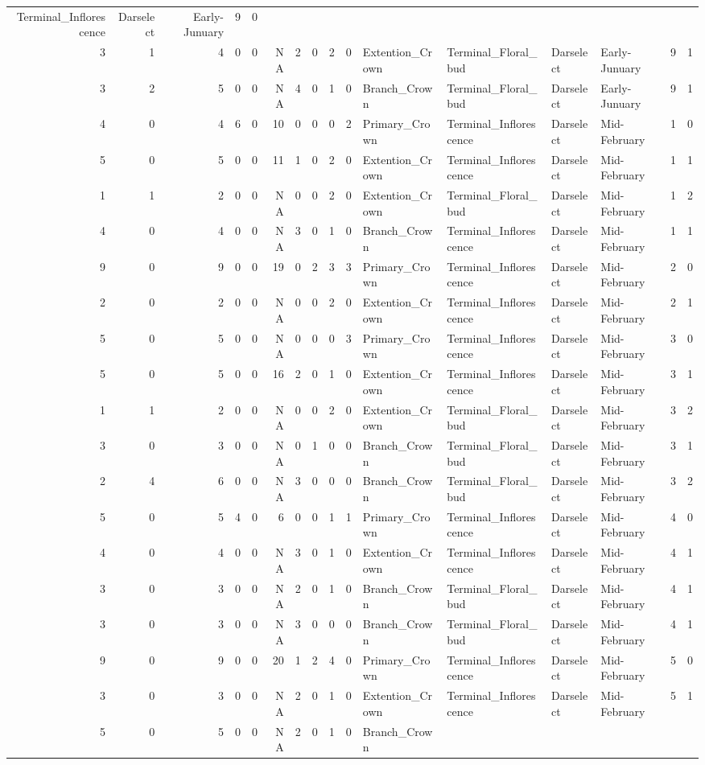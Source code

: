 \documentclass[]{article}
\begin{document}
\begin{longtable}[]{@{}rrrrrrrrrrllllrl@{}}
Terminal\_Inflorescence & Darselect & Early-Junuary & 9 &
0\tabularnewline
3 & 1 & 4 & 0 & 0 & NA & 2 & 0 & 2 & 0 & Extention\_Crown &
Terminal\_Floral\_bud & Darselect & Early-Junuary & 9 & 1\tabularnewline
3 & 2 & 5 & 0 & 0 & NA & 4 & 0 & 1 & 0 & Branch\_Crown &
Terminal\_Floral\_bud & Darselect & Early-Junuary & 9 & 1\tabularnewline
4 & 0 & 4 & 6 & 0 & 10 & 0 & 0 & 0 & 2 & Primary\_Crown &
Terminal\_Inflorescence & Darselect & Mid-February & 1 &
0\tabularnewline
5 & 0 & 5 & 0 & 0 & 11 & 1 & 0 & 2 & 0 & Extention\_Crown &
Terminal\_Inflorescence & Darselect & Mid-February & 1 &
1\tabularnewline
1 & 1 & 2 & 0 & 0 & NA & 0 & 0 & 2 & 0 & Extention\_Crown &
Terminal\_Floral\_bud & Darselect & Mid-February & 1 & 2\tabularnewline
4 & 0 & 4 & 0 & 0 & NA & 3 & 0 & 1 & 0 & Branch\_Crown &
Terminal\_Inflorescence & Darselect & Mid-February & 1 &
1\tabularnewline
9 & 0 & 9 & 0 & 0 & 19 & 0 & 2 & 3 & 3 & Primary\_Crown &
Terminal\_Inflorescence & Darselect & Mid-February & 2 &
0\tabularnewline
2 & 0 & 2 & 0 & 0 & NA & 0 & 0 & 2 & 0 & Extention\_Crown &
Terminal\_Inflorescence & Darselect & Mid-February & 2 &
1\tabularnewline
5 & 0 & 5 & 0 & 0 & NA & 0 & 0 & 0 & 3 & Primary\_Crown &
Terminal\_Inflorescence & Darselect & Mid-February & 3 &
0\tabularnewline
5 & 0 & 5 & 0 & 0 & 16 & 2 & 0 & 1 & 0 & Extention\_Crown &
Terminal\_Inflorescence & Darselect & Mid-February & 3 &
1\tabularnewline
1 & 1 & 2 & 0 & 0 & NA & 0 & 0 & 2 & 0 & Extention\_Crown &
Terminal\_Floral\_bud & Darselect & Mid-February & 3 & 2\tabularnewline
3 & 0 & 3 & 0 & 0 & NA & 0 & 1 & 0 & 0 & Branch\_Crown &
Terminal\_Floral\_bud & Darselect & Mid-February & 3 & 1\tabularnewline
2 & 4 & 6 & 0 & 0 & NA & 3 & 0 & 0 & 0 & Branch\_Crown &
Terminal\_Floral\_bud & Darselect & Mid-February & 3 & 2\tabularnewline
5 & 0 & 5 & 4 & 0 & 6 & 0 & 0 & 1 & 1 & Primary\_Crown &
Terminal\_Inflorescence & Darselect & Mid-February & 4 &
0\tabularnewline
4 & 0 & 4 & 0 & 0 & NA & 3 & 0 & 1 & 0 & Extention\_Crown &
Terminal\_Inflorescence & Darselect & Mid-February & 4 &
1\tabularnewline
3 & 0 & 3 & 0 & 0 & NA & 2 & 0 & 1 & 0 & Branch\_Crown &
Terminal\_Floral\_bud & Darselect & Mid-February & 4 & 1\tabularnewline
3 & 0 & 3 & 0 & 0 & NA & 3 & 0 & 0 & 0 & Branch\_Crown &
Terminal\_Floral\_bud & Darselect & Mid-February & 4 & 1\tabularnewline
9 & 0 & 9 & 0 & 0 & 20 & 1 & 2 & 4 & 0 & Primary\_Crown &
Terminal\_Inflorescence & Darselect & Mid-February & 5 &
0\tabularnewline
3 & 0 & 3 & 0 & 0 & NA & 2 & 0 & 1 & 0 & Extention\_Crown &
Terminal\_Inflorescence & Darselect & Mid-February & 5 &
1\tabularnewline
5 & 0 & 5 & 0 & 0 & NA & 2 & 0 & 1 & 0 & Branch\_Crown &

\end{longtable}
\end{document}
